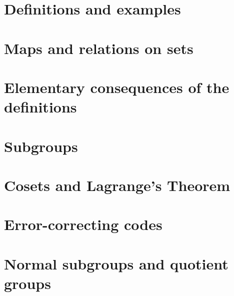 

\newcommand{\get}[1]{\section{#1}}



\get{Definitions and examples}
\get{Maps and relations on sets}
\get{Elementary consequences of the definitions}
\get{Subgroups}
\get{Cosets and Lagrange's Theorem}
\get{Error-correcting codes}
\get{Normal subgroups and quotient groups}


